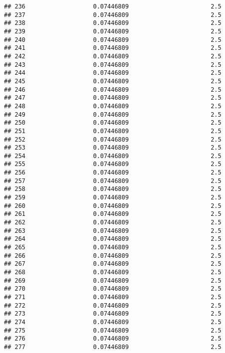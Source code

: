 \documentclass[]{article}
\begin{document}
\begin{verbatim}
## 236                   0.07446809                       2.5
## 237                   0.07446809                       2.5
## 238                   0.07446809                       2.5
## 239                   0.07446809                       2.5
## 240                   0.07446809                       2.5
## 241                   0.07446809                       2.5
## 242                   0.07446809                       2.5
## 243                   0.07446809                       2.5
## 244                   0.07446809                       2.5
## 245                   0.07446809                       2.5
## 246                   0.07446809                       2.5
## 247                   0.07446809                       2.5
## 248                   0.07446809                       2.5
## 249                   0.07446809                       2.5
## 250                   0.07446809                       2.5
## 251                   0.07446809                       2.5
## 252                   0.07446809                       2.5
## 253                   0.07446809                       2.5
## 254                   0.07446809                       2.5
## 255                   0.07446809                       2.5
## 256                   0.07446809                       2.5
## 257                   0.07446809                       2.5
## 258                   0.07446809                       2.5
## 259                   0.07446809                       2.5
## 260                   0.07446809                       2.5
## 261                   0.07446809                       2.5
## 262                   0.07446809                       2.5
## 263                   0.07446809                       2.5
## 264                   0.07446809                       2.5
## 265                   0.07446809                       2.5
## 266                   0.07446809                       2.5
## 267                   0.07446809                       2.5
## 268                   0.07446809                       2.5
## 269                   0.07446809                       2.5
## 270                   0.07446809                       2.5
## 271                   0.07446809                       2.5
## 272                   0.07446809                       2.5
## 273                   0.07446809                       2.5
## 274                   0.07446809                       2.5
## 275                   0.07446809                       2.5
## 276                   0.07446809                       2.5
## 277                   0.07446809                       2.5

\end{verbatim}
\end{document}
